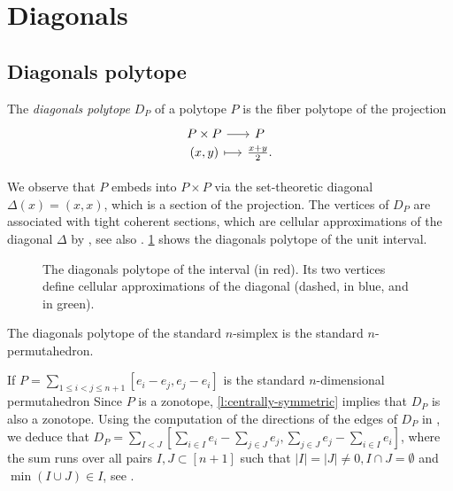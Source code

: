 
\section{Diagonals} \label{s:diagonals}


\subsection{Diagonals polytope}

\begin{definition}
	The \emph{diagonals polytope} $D_P$ of a polytope $P$ is the fiber polytope of the projection
	\[
	\begin{tikzcd}[row sep=-2,column sep=small]
		P \times P \arrow[r] & P \\
		(x,y) \arrow[r,mapsto] &\textstyle\frac{x+y}{2}.
	\end{tikzcd}
	\]
\end{definition}

We observe that $P$ embeds into $P\times P$ via the set-theoretic diagonal $\Delta (x)=(x,x)$, which is a section of the projection.
The vertices of $D_P$ are associated with tight coherent sections, which are cellular approximations of the diagonal $\Delta$ by \cite[Proposition 5]{MTTV19}, see also \cite[Proposition 1.1]{GLA21}.
\cref{f:diagonal-interval} shows the diagonals polytope of the unit interval. 

\begin{figure}[h!]
	\centering
	
	\caption{The diagonals polytope of the interval (in red). Its two vertices define cellular approximations of the diagonal (dashed, in blue, and in green).}
	\label{f:diagonal-interval}
\end{figure}

\begin{example}
\label{e:simplex-permutahedron}
	The diagonals polytope of the standard $n$-simplex is the standard $n$-permutahedron. 
\end{example}

\begin{example} 
\label{e:permutahedron}
	If $P=\sum_{1 \leq i<j \leq n+1} [e_i-e_j, e_j-e_i]$ is the standard $n$-dimensional permutahedron
	Since $P$ is a zonotope, \cref{l:centrally-symmetric} implies that $D_P$ is also a zonotope. 
	Using the computation of the directions of the edges of $D_P$ in \cite[Theorem 3.6]{GLA21}, we deduce that $D_P=\sum_{I<J} [\sum_{i \in I}e_i - \sum_{j \in J}e_j, \sum_{j \in J} e_j - \sum_{i \in I}e_i]$, where the sum runs over all pairs $I,J\subset [n+1]$ such that $|I|=|J|\neq 0, I\cap J = \emptyset$ and $\min(I \cup J) \in I$, see .
\end{example}

